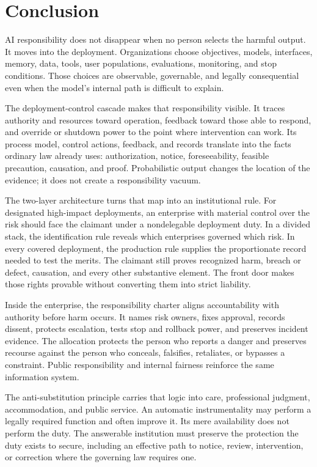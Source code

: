 \section*{Conclusion}
\label{sec:conclusion}

AI responsibility does not disappear when no person selects the harmful output. It moves into the deployment. Organizations choose objectives, models, interfaces, memory, data, tools, user populations, evaluations, monitoring, and stop conditions. Those choices are observable, governable, and legally consequential even when the model's internal path is difficult to explain.

The deployment-control cascade makes that responsibility visible. It traces authority and resources toward operation, feedback toward those able to respond, and override or shutdown power to the point where intervention can work. Its process model, control actions, feedback, and records translate into the facts ordinary law already uses: authorization, notice, foreseeability, feasible precaution, causation, and proof. Probabilistic output changes the location of the evidence; it does not create a responsibility vacuum.

The two-layer architecture turns that map into an institutional rule. For designated high-impact deployments, an enterprise with material control over the risk should face the claimant under a nondelegable deployment duty. In a divided stack, the identification rule reveals which enterprises governed which risk. In every covered deployment, the production rule supplies the proportionate record needed to test the merits. The claimant still proves recognized harm, breach or defect, causation, and every other substantive element. The front door makes those rights provable without converting them into strict liability.

Inside the enterprise, the responsibility charter aligns accountability with authority before harm occurs. It names risk owners, fixes approval, records dissent, protects escalation, tests stop and rollback power, and preserves incident evidence. The allocation protects the person who reports a danger and preserves recourse against the person who conceals, falsifies, retaliates, or bypasses a constraint. Public responsibility and internal fairness reinforce the same information system.

The anti-substitution principle carries that logic into care, professional judgment, accommodation, and public service. An automatic instrumentality may perform a legally required function and often improve it. Its mere availability does not perform the duty. The answerable institution must preserve the protection the duty exists to secure, including an effective path to notice, review, intervention, or correction where the governing law requires one.

